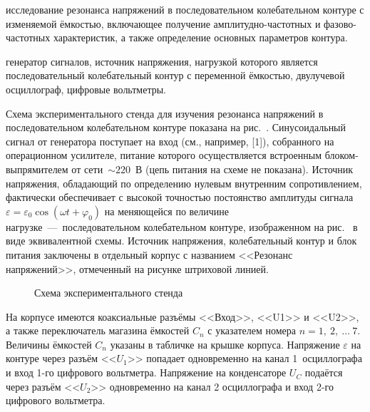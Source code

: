 
\begin{lab:aim}
     исследование резонанса напряжений в последовательном колебательном контуре с изменяемой ёмкостью, включающее получение амплитудно-частотных и фазово-частотных характеристик, а также определение основных параметров контура.
\end{lab:aim}

\begin{lab:equipment}
	генератор сигналов, источник напряжения, нагрузкой которого является последовательный колебательный контур с переменной ёмкостью, двулучевой осциллограф, цифровые вольтметры.
\end{lab:equipment}


\experiment
Схема экспериментального стенда для изучения резонанса напряжений в последовательном колебательном контуре показана на рис.~. Синусоидальный сигнал от генератора поступает на вход  (см., например, [1]), собранного на операционном усилителе, питание которого осуществляется встроенным блоком-выпрямителем от сети~$\sim220$~В (цепь питания на схеме не показана). Источник напряжения, обладающий по определению нулевым внутренним сопротивлением, фактически обеспечивает с высокой точностью постоянство амплитуды сигнала~$\varepsilon=\varepsilon_0\cos(\omega t+\varphi_0)$ на меняющейся по величине нагрузке~---~последовательном колебательном контуре, изображенном на рис.~ в виде эквивалентной схемы. Источник напряжения, колебательный контур и блок питания заключены в отдельный корпус с названием <<Резонанс напряжений>>, отмеченный на рисунке штриховой линией.
\begin{figure}[h!]
	\caption{Схема экспериментального стенда}
\end{figure}
На корпусе имеются коаксиальные разъёмы <<Вход>>, <<U1>> и <<U2>>, а также переключатель магазина ёмкостей $C_n$ с указателем номера $n=1,~2,~\ldots~7.$ Величины ёмкостей $C_n$ указаны в табличке на крышке корпуса. Напряжение $\varepsilon$ на контуре через разъём <<$U_1$>> попадает одновременно на канал 1~осциллографа и вход 1-го цифрового вольтметра. Напряжение на конденсаторе $U_C$ подаётся через разъём <<$U_2$>> одновременно на канал 2 осциллографа и вход 2-го цифрового вольтметра.

